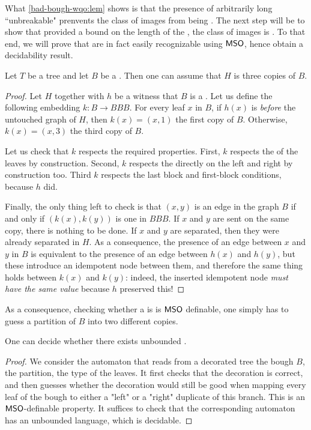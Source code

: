 \AP What \cref{bad-bough-wqo:lem} shows is that the presence of arbitrarily
long ``unbreakable"  prenvents the class of images from being
. The next step will be to show that provided a
bound on the length of the , the class of images is
.  To that end, we will 
prove that  are in fact easily recognizable
using $\mathsf{MSO}$, hence obtain a decidability result.

\begin{lemma}
    \label{good-bough-recognizable:lem}
    Let $T$ be a tree and let $B$ be a .
    Then one can assume that $H$ is three copies of $B$.
\end{lemma}
\begin{proof}
    Let $H$ together with $h$ be a witness that $B$ is a .
    Let us define the following embedding $k \colon B \to BBB$.
    For every leaf $x$ in $B$, if $h(x)$ is \emph{before} the untouched graph
    of $H$, then $k(x) = (x,1)$ the first copy of $B$.
    Otherwise, $k(x) = (x,3)$ the third copy of $B$.

    Let us check that $k$ respects the required properties.
    First, $k$ respects the  of the leaves by construction.
    Second, $k$ respects the  directly on the left and right
    by construction too.
    Third $k$ respects the last block and first-block conditions, because $h$
    did.

    Finally, the only thing left to check is that $(x,y)$ is an edge in the
    graph $B$ if and only if $(k(x), k(y))$ is one in $BBB$.
    If $x$ and $y$ are sent on the same copy, there is nothing to be done.
    If $x$ and $y$ are separated, then
    they were already separated in $H$.
    As a consequence, the presence of an edge between $x$ and $y$ in $B$ is
    equivalent to the presence of an edge between $h(x)$ and $h(y)$,
    but these introduce an idempotent node between them,
    and therefore the same thing holds between $k(x)$ and $k(y)$: indeed,
    the inserted idempotent node \emph{must have the same value}
    because $h$ preserved this!
\end{proof}

As a consequence, checking whether a  is  is $\mathsf{MSO}$
definable, one simply has to guess a partition of $B$ into two different
copies.

\begin{lemma}
    \label{bad-boughs-decidable:lem}
    One can decide whether there exists unbounded
    .
\end{lemma}
\begin{proof}
    We consider the automaton that reads from a decorated tree
    the bough $B$, the partition, the type of the leaves. 
    It first checks that the decoration is correct, and then
    guesses whether the decoration would still be good when
    mapping every leaf of the bough to either a "left" or a "right"
    duplicate of this branch. This is an $\mathsf{MSO}$-definable property.
    It suffices to check that the corresponding automaton
    has an unbounded language, which is decidable.
\end{proof}

